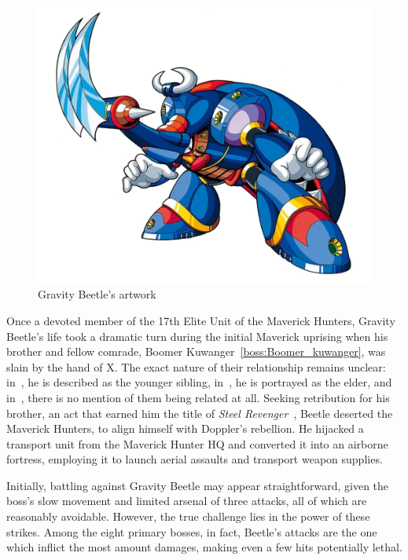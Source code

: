 \begin{figure}[htp]
	\centering
	\includegraphics[height=\portraitsize]{figures/X3/Gravity_beetle/gravitybeetle.png}
	\caption{Gravity Beetle's artwork~\cite{book:MMX_Complete_art}}
\end{figure}

Once a devoted member of the 17th Elite Unit of the Maverick Hunters, Gravity Beetle's life took a dramatic turn during the initial Maverick uprising when his brother and fellow comrade, Boomer Kuwanger~\ref{boss:Boomer_kuwanger}, was slain by the hand of X. The exact nature of their relationship remains unclear: in~\cite{book:Compendium}, he is described as the younger sibling, in~\cite{wayback:X3_resources}, he is portrayed as the elder, and in~\cite{Xcoll1:Manual_X3}, there is no mention of them being related at all. Seeking retribution for his brother, an act that earned him the title of \textit{Steel Revenger}~\cite{book:MMX_Complete_art}, Beetle deserted the Maverick Hunters, to align himself with Doppler's rebellion. He hijacked a transport unit from the Maverick Hunter HQ and converted it into an airborne fortress, employing it to launch aerial assaults and transport weapon supplies\cite{Xcoll1:Manual_X3,wayback:X3_resources,wiki:Gravity_beetle}.
 
Initially, battling against Gravity Beetle may appear straightforward, given the boss's slow movement and limited arsenal of three attacks, all of which are reasonably avoidable. However, the true challenge lies in the power of these strikes. Among the eight primary bosses, in fact, Beetle's attacks are the one which inflict the most amount damages, making even a few hits potentially lethal.

